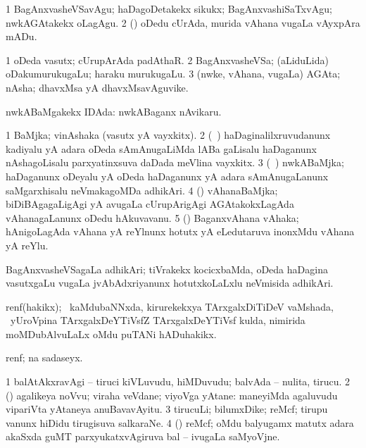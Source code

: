 {{{{{{\begin{center}
{{\noindent
\gl{\akirx}
\expl{}
\bmng
\bnum
\num{1} BagAnxvasheVSavAgu; haDagoDetakekx sikukx; BagAnxvashiSaTxvAgu; nwkAGAtakekx oLagAgu. 
\num{2} (\ame) oDedu cUrAda, murida vAhana \mo vugaLa vAyxpAra mADu. 
\enum
\emng
\eentry

\bentry
{} 
\gl{\nA}
\expl{}
\bmng
\bnum
\num{1} oDeda vasutx; cUrupArAda padAthaR. 
\num{2} BagAnxvasheVSa; (aLiduLida) oDakumurukugaLu; haraku murukugaLu. 
\num{3} (nwke, vAhana, \mo vugaLa) AGAta; nAsha; dhavxMsa yA dhavxMsavAguvike. 
\enum
\emng
\eentry

\bentry
{} 
\gl{\gu}
\expl{}
\bmng
nwkABaMgakekx IDAda:  nwkABaganx nAvikaru. 
\emng
\eentry

\bentry
{} 
\gl{\nA}
\expl{}
\bmng
\bnum
\num{1} BaMjka; vinAshaka (vasutx yA vayxkitx). 
\num{2} (\kanmu\ \ca) haDaginalilxruvudanunx kadiyalu yA adara oDeda sAmAnugaLiMda lABa gaLisalu haDaganunx nAshagoLisalu parxyatinxsuva daDada meVlina vayxkitx. 
\num{3} (\kanmu\ \ame) nwkABaMjka; haDaganunx oDeyalu yA oDeda haDaganunx yA adara sAmAnugaLanunx saMgarxhisalu neVmakagoMDa adhikAri. 
\num{4} (\ame) vAhanaBaMjka; biDiBAgagaLigAgi yA avugaLa cUrupArigAgi AGAtakokxLagAda vAhanagaLanunx oDedu hAkuvavanu. 
\num{5} (\ame) BaganxvAhana vAhaka; hAnigoLagAda vAhana yA reYlnunx hotutx yA eLedutaruva inonxMdu vAhana yA reYlu. 
\enum
\emng
\eentry

\bentry
{} 
\gl{\nA}
\expl{}
\bmng
BagAnxvasheVSagaLa adhikAri; tiVrakekx kocicxbaMda, oDeda haDagina vasutxgaLu \mo vugaLa jvAbAdxriyanunx hotutxkoLaLxlu neVmisida adhikAri. 
\emng
\eentry

\bentry 
{} 
\gl{\nA}
\expl{}
\bmng
renf(hakikx); \sA\ kaMdubaNNxda, kirurekekxya TArxgalxDiTiDeV vaMshada, \kanmu\ yUroVpina TArxgalxDeYTiVsfZ TArxgalxDeYTiVsf kulda, nimirida moMDubAlvuLaLx oMdu puTANi hADuhakikx. 
\emng
\eentry

\bentry 
{} 
\gl{\nA}
\expl{}
\bmng
renf; \eng{(\UK)}  na sadaseyx. 
\emng
\eentry

\bentry
{} 
\gl{\nA}
\expl{}
\bmng
\bnum
\num{1} balAtAkxravAgi -- tiruci kiVLuvudu, hiMDuvudu; balvAda -- nulita, tirucu. 
\num{2} (\rUpa) agalikeya noVvu; viraha veVdane; viyoVga yAtane:  maneyiMda agaluvudu vipariVta yAtaneya anuBavavAyitu. 
\num{3} tirucuLi; bilumxDike; reMcf; tirupu \mo vanunx hiDidu tirugisuva salkaraNe. 
\num{4} (\Bwvi) reMcf; oMdu balyugamx  matutx adara akaSxda guMT parxyukatxvAgiruva bal -- ivugaLa saMyoVjne. 
\enum
\emng
\eentry

}}
\end{center}}}}}}}
